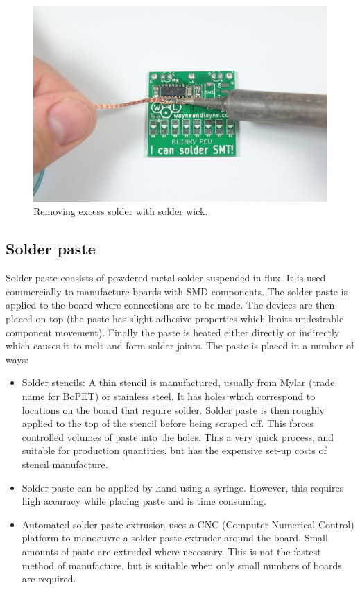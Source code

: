 \begin{figure}[ht!]
\centering
\includegraphics[width=120mm]{resources/handsoldering.jpg}
\caption{Removing excess solder with solder wick.}
\label{handsolder}
\end{figure}

\subsection{Solder paste}

Solder paste consists of powdered metal solder suspended in flux. It is used commercially to manufacture boards with SMD components. The solder paste is applied to the board where
connections are to be made. The devices are then placed on top (the paste has slight adhesive properties which limits undesirable component movement). Finally the paste is heated either directly
or indirectly which causes it to melt and form solder joints. The paste is placed in a number of ways:

\begin{itemize}
			\item	Solder stencils: A thin stencil is manufactured, usually from Mylar (trade name for BoPET) or stainless steel. It has holes which correspond to locations on the board that require solder.
					Solder paste is then roughly applied to the top of the stencil before being scraped off. This forces controlled volumes of paste into the holes.
					This a very quick process, and suitable for production quantities, but has the expensive set-up costs of stencil manufacture.
			\item	Solder paste can be applied by hand using a syringe. However, this requires high accuracy while placing paste and is time consuming.
			\item	Automated solder paste extrusion uses a CNC (Computer Numerical Control) platform to manoeuvre a solder paste extruder around the board. Small amounts of paste
					are extruded where necessary. This is not the fastest method of manufacture, but is suitable when only small numbers of boards are required.
\end{itemize}

